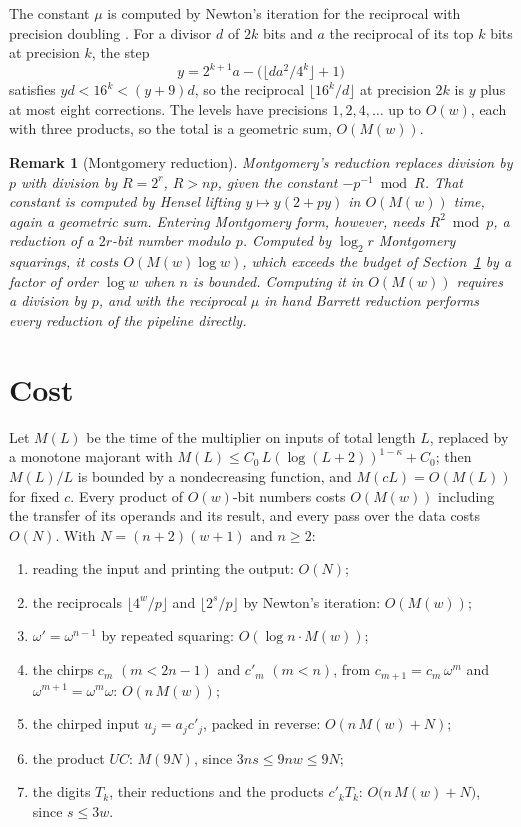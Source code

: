 \documentclass[11pt]{amsart}
\newtheorem{remark}[lemma]{Remark}
\begin{document}
The constant $\mu$ is computed by Newton's iteration for the reciprocal with precision
doubling \cite[\S 4.3.3]{Knu}. For a divisor $d$ of $2k$ bits and $a$ the reciprocal of its top
$k$ bits at precision $k$, the step
\[
  y = 2^{k+1} a - \bigl(\lfloor d a^2 / 4^k \rfloor + 1\bigr)
\]
satisfies $y d < 16^k < (y + 9) d$, so the reciprocal $\lfloor 16^k / d \rfloor$ at precision
$2k$ is $y$ plus at most eight corrections. The levels have precisions $1, 2, 4, \dots$ up to
$O(w)$, each with three products, so the total is a geometric sum, $O(M(w))$.

\begin{remark}[Montgomery reduction]
\label{rem:montgomery}
Montgomery's reduction \cite{Mon} replaces division by $p$ with division by $R = 2^r$,
$R > np$, given the constant $-p^{-1} \bmod R$. That constant is computed by Hensel lifting
$y \mapsto y(2 + py)$ in $O(M(w))$ time, again a geometric sum. Entering Montgomery form,
however, needs $R^2 \bmod p$, a reduction of a $2r$-bit number modulo $p$. Computed by
$\log_2 r$ Montgomery squarings, it costs $O(M(w) \log w)$, which exceeds the budget of
Section~\ref{sec:cost} by a factor of order $\log w$ when $n$ is bounded. Computing it in $O(M(w))$ requires a division by $p$, and with the
reciprocal $\mu$ in hand Barrett reduction performs every reduction of the pipeline directly.
\end{remark}

\section{Cost}
\label{sec:cost}

Let $M(L)$ be the time of the multiplier on inputs of total length $L$, replaced by a monotone
majorant with $M(L) \le C_0\, L (\log(L+2))^{1-\kappa} + C_0$; then $M(L)/L$ is bounded by a
nondecreasing function, and $M(cL) = O(M(L))$ for fixed $c$. Every product of $O(w)$-bit numbers
costs $O(M(w))$ including the transfer of its operands and its result, and every pass over the
data costs $O(N)$. With $N = (n+2)(w+1)$ and $n \ge 2$:

\begin{enumerate}
\item reading the input and printing the output: $O(N)$;
\item the reciprocals $\lfloor 4^w / p \rfloor$ and $\lfloor 2^s / p \rfloor$ by Newton's
  iteration: $O(M(w))$;
\item $\omega' = \omega^{n-1}$ by repeated squaring: $O(\log n \cdot M(w))$;
\item the chirps $c_m$ $(m < 2n-1)$ and $c'_m$ $(m < n)$, from $c_{m+1} = c_m\, \omega^m$ and
  $\omega^{m+1} = \omega^m \omega$: $O(n\, M(w))$;
\item the chirped input $u_j = a_j c'_j$, packed in reverse: $O(n\, M(w) + N)$;
\item the product $UC$: $M(9N)$, since $3ns \le 9 n w \le 9N$;
\item the digits $T_k$, their reductions and the products $c'_k T_k$:
  $O\bigl(n\, M(w) + N\bigr)$, since $s \le 3w$.
\end{enumerate}
\end{document}
